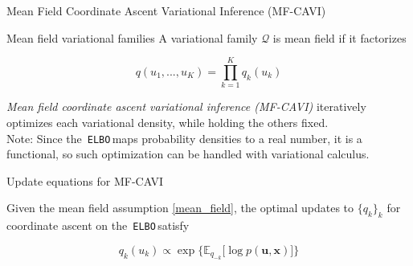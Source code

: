 \documentclass[10pt]{beamer}
\numberwithin{equation}{section}
\theoremstyle{definition}
\newcommand{\ds}{\displaystyle}
\newcommand{\+}[1]{\ensuremath{{\boldsymbol #1}}} %
\newcommand{\E}{\mathbb{E}}
\newcommand{\Q}{\mathcal{Q}}
\newcommand{\set}[1] { \{  {#1} \} }
\newcommand{\ELBO}{\,\texttt{ELBO}\,}
\begin{document}
\begin{frame}{Mean Field Coordinate Ascent Variational Inference (MF-CAVI)}

\begin{block}{Mean field variational families}
A variational family $\Q$ is mean field if it factorizes 

\begin{equation} \label{mean_field}
q(u_1, ..., u_K) = \ds\prod_{k=1}^K q_k(u_k)
\end{equation}
\end{block}

\textit{Mean field coordinate ascent variational inference (MF-CAVI)} iteratively optimizes each variational density, while holding the others fixed. \\
\vfill
 \tiny \alert{Note}: Since the \ELBO maps probability densities to a real number, it is a functional, so such optimization can be handled with variational calculus.   
   
\end{frame}

\begin{frame}{Update equations for MF-CAVI}

Given the mean field assumption \eqref{mean_field}, the optimal updates to $\set{q_k}_k$ for coordinate ascent on the \ELBO satisfy 
 
\begin{equation} \label{mfcavi_update}
q_k(u_k) \propto \exp \bigg\{ \E_{q_{-k}} \bigg[  \log p(\+u, \+x)\bigg] \bigg\}
\end{equation}

%
%


\end{frame}
\end{document}
